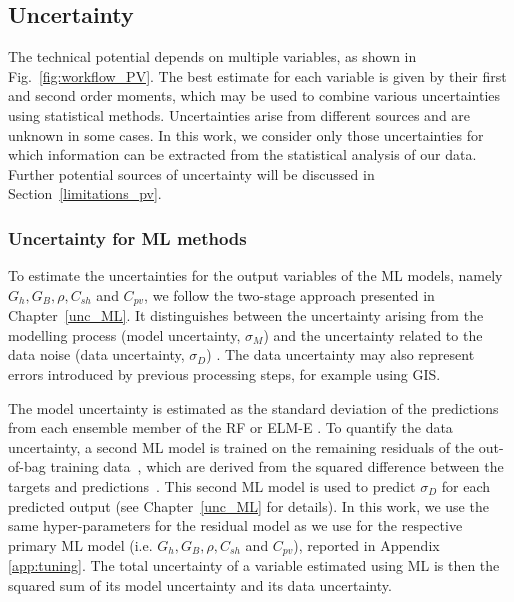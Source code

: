 
\subsection{Uncertainty}
\label{unc}

The technical potential depends on multiple variables, as shown in Fig.~\ref{fig:workflow_PV}. 
The best estimate for each variable is given by their first and second order moments, which may be used to combine various uncertainties using statistical methods.
%
Uncertainties arise from different sources and are unknown in some cases. 
In this work, we consider only those uncertainties for which information can be extracted from the statistical analysis of our data. Further potential sources of uncertainty will be discussed in Section~\ref{limitations_pv}.

\subsubsection{Uncertainty for ML methods}

To estimate the uncertainties for the output variables of the ML models, namely $G_h, G_B, \rho, C_{sh}$ and $C_{\mathit{pv}}$, we follow the two-stage approach presented in Chapter~\ref{unc_ML}. 
It distinguishes between the uncertainty arising from the modelling process (model uncertainty, $\sigma_M$) and the uncertainty related to the data noise (data uncertainty, $\sigma_D$) \cite{wan_probabilistic_2014}. 
The data uncertainty may also represent errors introduced by previous processing steps, for example using GIS. 

The model uncertainty is estimated as the standard deviation of the predictions from each ensemble member of the RF or ELM-E \cite{heskes_practical_1997, wan_probabilistic_2014}. 
To quantify the data uncertainty, a second ML model is trained on the remaining residuals of the out-of-bag training data~\cite{breiman_bagging_1996}, which are derived from the squared difference between the targets and predictions~\cite{heskes_practical_1997, wan_probabilistic_2014}. This second ML model is used to predict $\sigma_D$ for each predicted output (see Chapter~\ref{unc_ML} for details). In this work, we use the same hyper-parameters for the residual model as we use for the respective primary ML model (i.e. $G_h, G_B, \rho, C_{sh}$ and $C_{\mathit{pv}}$), reported in Appendix \ref{app:tuning}.
The total uncertainty of a variable estimated using ML is then the squared sum of its model uncertainty and its data uncertainty.

